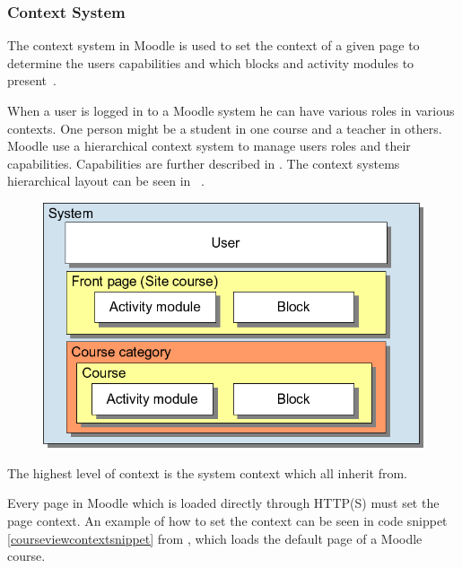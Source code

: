 \subsubsection{Context System}
\label{sub:contextsystem}
The context system in Moodle is used to set the context of a given page to determine the users capabilities and which blocks and activity modules to present~\cite{moodlerolesandmodules}.
 
When a user is logged in to a Moodle system he can have various roles in various contexts. 
One person might be a student in one course and a teacher in others. 
Moodle use a hierarchical context system to manage users roles and their capabilities. 
Capabilities are further described in . 
The context systems hierarchical layout can be seen in ~\cite{moodlefilemoodlecontext}.
 
 \begin{figure}
	 \centering
		 \includegraphics[width=\textwidth]{images/moodle-contexts.png}
	 \label{fig:moodle-contexts}
 \end{figure}

The highest level of context is the system context which all inherit from. 

Every page in Moodle which is loaded directly through HTTP(S) must set the page context. 
An example of how to set the context can be seen in code snippet \ref{courseviewcontextsnippet} from , which loads the default page of a Moodle course.

